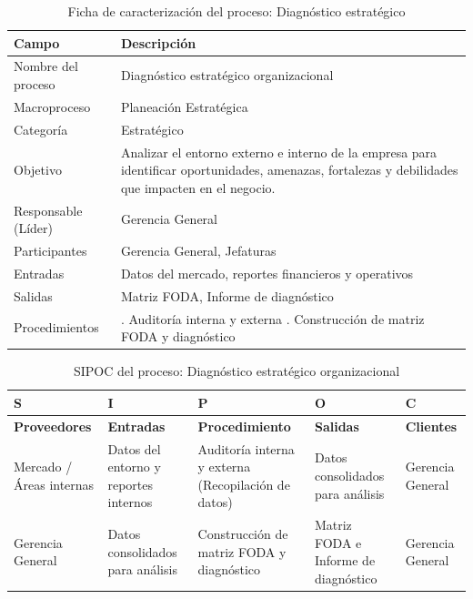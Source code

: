 \documentclass[11pt, a4paper, oneside]{report}
\begin{document}
\begin{table}[H]
\centering\small
\renewcommand{\arraystretch}{1.35}
\setlength{\tabcolsep}{6pt}
\begin{tabularx}{\textwidth}{|>{\raggedright\arraybackslash}p{}|>{\raggedright\arraybackslash}X|}
\hline
\rowcolor{upeu_dark}
\color{white}\bfseries Campo & \color{white}\bfseries Descripción \\ \hline
\rowcolor{gray!10}
Nombre del proceso & Diagnóstico estratégico organizacional \\ \hline
Macroproceso & Planeación Estratégica \\ \hline
\rowcolor{gray!10}
Categoría & Estratégico \\ \hline
Objetivo & Analizar el entorno externo e interno de la empresa para identificar oportunidades, amenazas, fortalezas y debilidades que impacten en el negocio. \\ \hline
\rowcolor{gray!10}
Responsable (Líder) & Gerencia General \\ \hline
Participantes & Gerencia General, Jefaturas \\ \hline
\rowcolor{gray!10}
Entradas & Datos del mercado, reportes financieros y operativos \\ \hline
Salidas & Matriz FODA, Informe de diagnóstico \\ \hline
\rowcolor{gray!10}
Procedimientos & 1. Auditoría interna y externa \newline 2. Construcción de matriz FODA y diagnóstico \\ \hline
\end{tabularx}
\caption{Ficha de caracterización del proceso: Diagnóstico estratégico}
\end{table}

\begin{table}[H]
\centering\small
\renewcommand{\arraystretch}{1.3}
\setlength{\tabcolsep}{4pt}
\begin{tabularx}{\textwidth}{|>{\raggedright\arraybackslash}p{}|>{\raggedright\arraybackslash}p{}|>{\raggedright\arraybackslash}p{}|>{\raggedright\arraybackslash}p{}|>{\raggedright\arraybackslash}X|}
\hline
\rowcolor{upeu_dark}
\color{white}\bfseries S & \color{white}\bfseries I & \color{white}\bfseries P & \color{white}\bfseries O & \color{white}\bfseries C \\ \hline
\rowcolor{upeu_light}
\bfseries Proveedores & \bfseries Entradas & \bfseries Procedimiento & \bfseries Salidas & \bfseries Clientes \\ \hline
Mercado / Áreas internas &
Datos del entorno y reportes internos &
Auditoría interna y externa (Recopilación de datos) &
Datos consolidados para análisis &
Gerencia General \\ \hline
\rowcolor{gray!10}
Gerencia General &
Datos consolidados para análisis &
Construcción de matriz FODA y diagnóstico &
Matriz FODA e Informe de diagnóstico &
Gerencia General \\ \hline
\end{tabularx}
\caption{SIPOC del proceso: Diagnóstico estratégico organizacional}
\end{table}
\end{document}
